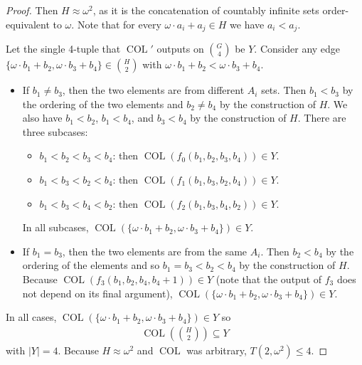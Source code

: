\documentclass[11pt]{article}
\newcommand{\om}{\omega}
\newcommand{\oequiv}{\approx}
\newcommand{\COL}{\operatorname{COL}}
\newcommand{\commonconst}{a}
\newcommand{\rareconst}{b}
\theoremstyle{plain}
\theoremstyle{definition}
\begin{document}
\begin{proof}
Then $H \oequiv \om^2$, as it is the concatenation of countably infinite sets order-equivalent to $\om$. Note that for every $\om \cdot \commonconst_i + \commonconst_j \in H$ we have $\commonconst_i < \commonconst_j$.

Let the single 4-tuple that $\COL'$ outputs on $\binom{G}{4}$ be $Y.$ Consider any edge $\{\om \cdot \rareconst_1 + \rareconst_2, \om \cdot \rareconst_3 + \rareconst_4\} \in \binom{H}{2}$ with $\om \cdot \rareconst_1 + \rareconst_2 < \om \cdot \rareconst_3 + \rareconst_4$. \begin{itemize}
\item If $\rareconst_1 \neq \rareconst_3$, then the two elements are from different $A_i$ sets. Then $\rareconst_1 < \rareconst_3$ by the ordering of the two elements and $\rareconst_2 \neq \rareconst_4$ by the construction of $H$. 
We also have $\rareconst_1 < \rareconst_2$, $\rareconst_1 < \rareconst_4$, and $\rareconst_3 < \rareconst_4$ by the construction of $H$.
There are three subcases: \begin{itemize}
    \item $\rareconst_1<\rareconst_2<\rareconst_3<\rareconst_4$: then $\COL(f_0(\rareconst_1,\rareconst_2,\rareconst_3,\rareconst_4)) \in Y.$
    \item $\rareconst_1<\rareconst_3<\rareconst_2<\rareconst_4$: then $\COL(f_1(\rareconst_1,\rareconst_3,\rareconst_2,\rareconst_4)) \in Y.$
    \item $\rareconst_1<\rareconst_3<\rareconst_4<\rareconst_2$: then $\COL(f_2(\rareconst_1,\rareconst_3,\rareconst_4,\rareconst_2)) \in Y.$
\end{itemize}
In all subcases, $\COL(\{\om \cdot \rareconst_1 + \rareconst_2, \om \cdot \rareconst_3 + \rareconst_4\}) \in Y.$
\item If $\rareconst_1 = \rareconst_3$, then the two elements are from the same $A_i.$ Then $\rareconst_2 < \rareconst_4$ by the ordering of the elements and so $\rareconst_1=\rareconst_3<\rareconst_2<\rareconst_4$ by the construction of $H$. Because $\COL(f_3(\rareconst_1,\rareconst_2,\rareconst_4,\rareconst_4+1)) \in Y$ (note that the output of $f_3$ does not depend on its final argument), $\COL(\{\om \cdot \rareconst_1 + \rareconst_2, \om \cdot \rareconst_3 + \rareconst_4\}) \in Y$.
\end{itemize}
In all cases, $\COL(\{\om \cdot \rareconst_1 + \rareconst_2, \om \cdot \rareconst_3 + \rareconst_4\}) \in Y$ so \begin{align*}
\COL\left(\binom{H}{2}\right) \subseteq Y
\end{align*} with $|Y|=4$. Because $H \oequiv \om^2$ and $\COL$ was arbitrary, $T\left(2, \om^2\right) \leq 4$.


\end{proof}
\end{document}
